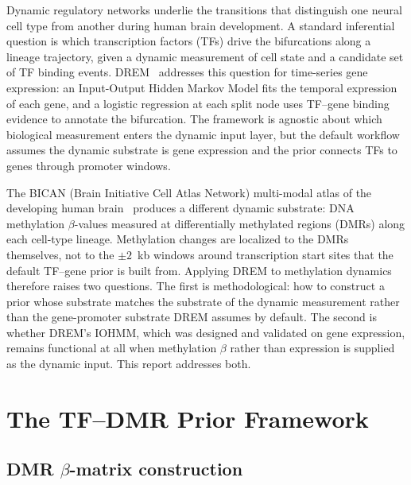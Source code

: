 \documentclass[sigconf,nonacm]{acmart}
\begin{document}
Dynamic regulatory networks underlie the transitions that distinguish
one neural cell type from another during human brain development. A
standard inferential question is which transcription factors (TFs)
drive the bifurcations along a lineage trajectory, given a dynamic
measurement of cell state and a candidate set of TF binding events.
DREM~\cite{ernst2007dremoriginal,schulz2012drem2} addresses this
question for time-series gene expression: an Input-Output Hidden
Markov Model fits the temporal expression of each gene, and a
logistic regression at each split node uses TF--gene binding evidence
to annotate the bifurcation. The framework is agnostic about which
biological measurement enters the dynamic input layer, but the
default workflow assumes the dynamic substrate is gene expression and
the prior connects TFs to genes through promoter windows.

The BICAN (Brain Initiative Cell Atlas Network) multi-modal
atlas of the developing human brain~\cite{bican2026manuscript}
produces a different dynamic
substrate: DNA methylation $\beta$-values measured at differentially
methylated regions (DMRs) along each cell-type lineage. Methylation
changes are localized to the DMRs themselves, not to the
$\pm 2$~kb windows around transcription start sites that the
default TF--gene prior is built from. Applying DREM to methylation
dynamics therefore raises two questions. The first is methodological:
how to construct a prior whose substrate matches the substrate of the
dynamic measurement rather than the gene-promoter substrate DREM
assumes by default. The second is whether DREM's IOHMM, which was
designed and validated on gene expression, remains functional at all
when methylation $\beta$ rather than expression is supplied as the
dynamic input. This report addresses both.


\section{The TF--DMR Prior Framework}
\label{sec:framework}

\subsection{DMR \texorpdfstring{$\beta$}{beta}-matrix construction}
\label{sec:framework:matrix}
\end{document}
